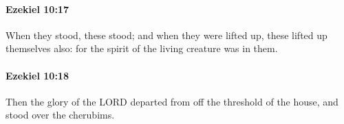		\paragraph{Ezekiel 10:17} %
			\label{EZEKIEL-10-17}

			When they stood, these stood; and when they were lifted up, these lifted up themselves also: for the spirit of the living creature was in them.


		\paragraph{Ezekiel 10:18} %
			\label{EZEKIEL-10-18}

			Then the glory of the LORD departed from off the threshold of the house, and stood over the cherubims.


